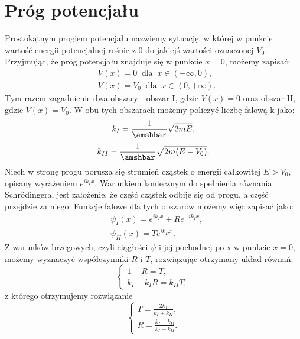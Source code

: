 \documentclass{SGGW-thesis}
\begin{document}
	\section{Próg potencjału}
	Prostokątnym progiem potencjału nazwiemy sytuację, w której w punkcie wartość energii potencjalnej rośnie z $0$ do jakiejś wartości oznaczonej $V_0$. Przyjmując, że próg potencjału znajduje się w punkcie $x = 0 $, możemy zapisać:
	\begin{equation}
	\begin{split}
		&V(x) = 0 \;\; \textrm{dla} \;\; x \in \left(-\infty, 0\right), \\
		&V(x) = V_0 \;\; \textrm{dla} \;\; x \in \left<0, +\infty\right).
	\end{split}
	\end{equation}
Tym razem zagadnienie dwa obszary - obszar I, gdzie $V(x)=0$ oraz obszar II, gdzie $V(x)=V_0$. W obu tych obszarach możemy policzyć liczbę falową k jako:
	\begin{equation}
	k_I = \frac{1}{\amshbar}\sqrt{2mE}	,
	\end{equation}
	\begin{equation}
	k_{II} = \frac{1}{\amshbar}\sqrt{2m(E-V_0)}.
	\end{equation}
Niech w stronę progu porusza się strumień cząstek o energii całkowitej $E > V_0$, opisany wyrażeniem $e^{ik_Ix}$. Warunkiem koniecznym do spełnienia równania Schrödingera, jest założenie, że część cząstek odbije się od progu, a część przejdzie za niego. Funkcje falowe dla tych obszarów możemy więc zapisać jako:
	\begin{equation}\label{eqn:potential-jump-solution}
	\begin{split}
	&\psi_I(x) = e^{ik_Ix} + Re^{-ik_Ix}, \\
	&\psi_{II}(x) = Te^{ik_{II}x}.
	\end{split}
	\end{equation}
Z warunków brzegowych, czyli ciągłości $\psi$ i jej pochodnej po x w punkcie $x=0$, możemy wyznaczyć współczynniki $R$ i $T$, rozwiązując otrzymany układ równań:
	\begin{equation}
	\begin{cases}
	1+ R = T, \\
	k_I-k_IR=k_{II}T,
	\end{cases}
	\end{equation}
z którego otrzymujemy rozwiązanie
	\begin{equation}
	\begin{cases}
	T = \frac{2k_I}{k_I+k_{II}}, \\
	R = \frac{k_I-k_{II}}{k_I+k_{II}}.
	\end{cases}
	\end{equation}
\end{document}
